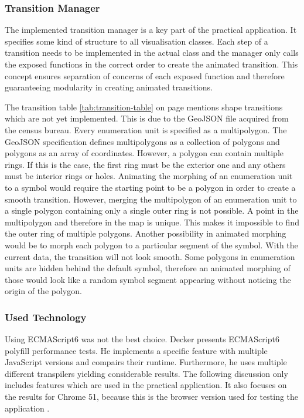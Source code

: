 \subsubsection{Transition Manager}
The implemented transition manager is a key part of the practical application. It specifies some kind of structure to all visualisation classes. Each step of a transition needs to be implemented in the actual class and the manager only calls the exposed functions in the correct order to create the animated transition. This concept ensures separation of concerns of each exposed function and therefore guaranteeing modularity in creating animated transitions.

The transition table \ref{tab:transition-table} on page \pageref{tab:transition-table} mentions shape transitions which are not yet implemented. This is due to the GeoJSON file acquired from the census bureau. Every enumeration unit is specified as a multipolygon. The GeoJSON specification defines multipolygons as a collection of polygons and polygons as an array of coordinates. However, a polygon can contain multiple rings. If this is the case, the first ring must be the exterior one and any others must be interior rings or holes.
Animating the morphing of an enumeration unit to a symbol would require the starting point to be a polygon in order to create a smooth transition. However, merging the multipolygon of an enumeration unit to a single polygon containing only a single outer ring is not possible. A point in the multipolygon and therefore in the map is unique. This makes it impossible to find the outer ring of multiple polygons.
Another possibility in animated morphing would be to morph each polygon to a particular segment of the symbol. With the current data, the transition will not look smooth. Some polygons in enumeration units are hidden behind the default symbol, therefore an animated morphing of those would look like a random symbol segment appearing without noticing the origin of the polygon.


\subsubsection{Used Technology}
Using ECMAScript6 was not the best choice. Decker presents ECMAScript6 polyfill performance tests. He implements a specific feature with multiple JavaScript versions and compairs their runtime. Furthermore, he uses multiple different transpilers yielding considerable results. The following discussion only includes features which are used in the practical application. It also focuses on the results for Chrome 51, because this is the browser version used for testing the application .


